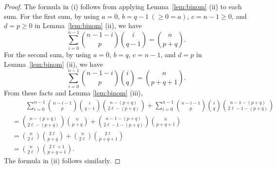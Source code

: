 \documentclass{amsart}
\numberwithin{equation}{section}
\theoremstyle{plain}
\theoremstyle{definition}
\begin{document}
\begin{proof}
    The formula in (i) follows from applying Lemma~\ref{lem:binom} (ii) to each sum.
    For the first sum, by using 
    $a = 0$, $b=q-1\ (\ge 0=a)$, $c=n-1\ge 0$, and $d=p \ge 0$ in Lemma~\ref{lem:binom} (ii),
    we have
    \[
    \sum_{i=0}^{n-1} \binom{n-1-i}{p}\binom{i}{q-1}=
    \binom{n}{p+q}.
    \]   
    For the second sum, by using 
    $a = 0$, $b=q$, $c=n-1$, and $d=p$ in Lemma~\ref{lem:binom} (ii),
    we have
    \[
    \sum_{i=0}^{n-1} \binom{n-1-i}{p}\binom{i}{q}=
    \binom{n}{p+q+1}.
    \]
    From these facts and Lemma \ref{lem:binom} (iii), 
    \[\begin{aligned}
        &\qquad \sum_{i=0}^{n-1} \binom{n-i-1}{p}\binom{i}{q-1}\binom{n-(p+q)}{2\ell-(p+q)} + \sum_{i=0}^{n-1} \binom{n-i-1}{p}\binom{i}{q}\binom{n-1-(p+q)}{2\ell-1-(p+q)} \\
        &= \binom{n-(p+q)}{2\ell-(p+q)}\binom{n}{p+q} + \binom{n-1-(p+q)}{2\ell-1-(p+q)}\binom{n}{p+q+1} \\
        &= \binom{n}{2\ell}\binom{2\ell}{p+q} + \binom{n}{2\ell}\binom{2\ell}{p+q+1} \\
        &= \binom{n}{2\ell}\binom{2\ell +1}{p+q+1}.
    \end{aligned}\]
    The formula in (ii) follows similarly.
\end{proof}
\end{document}
